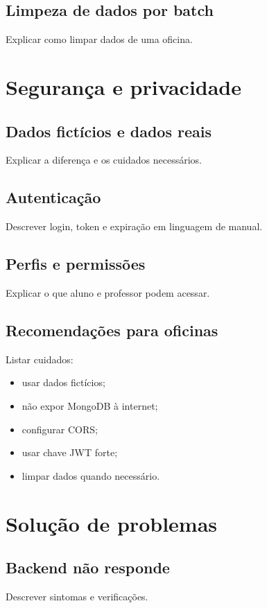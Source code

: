 \documentclass[12pt,a4paper]{article}
\begin{document}
\subsection{Limpeza de dados por batch}
Explicar como limpar dados de uma oficina.

\section{Segurança e privacidade}

\subsection{Dados fictícios e dados reais}
Explicar a diferença e os cuidados necessários.

\subsection{Autenticação}
Descrever login, token e expiração em linguagem de manual.

\subsection{Perfis e permissões}
Explicar o que aluno e professor podem acessar.

\subsection{Recomendações para oficinas}
Listar cuidados:
\begin{itemize}
    \item usar dados fictícios;
    \item não expor MongoDB à internet;
    \item configurar CORS;
    \item usar chave JWT forte;
    \item limpar dados quando necessário.
\end{itemize}

\section{Solução de problemas}

\subsection{Backend não responde}
Descrever sintomas e verificações.
\end{document}
